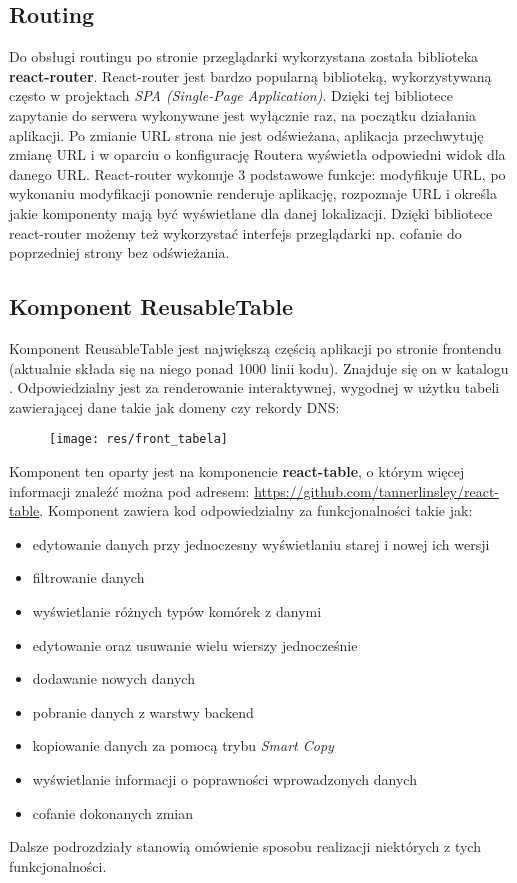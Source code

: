 \documentclass[11pt]{article}
\begin{document}
\subsection{Routing}
Do obsługi routingu po stronie przeglądarki wykorzystana została biblioteka \textbf{react-router}. React-router jest bardzo popularną biblioteką, wykorzystywaną często w projektach \emph{SPA (Single-Page Application)}. Dzięki tej bibliotece zapytanie do serwera wykonywane jest wyłącznie raz, na początku działania aplikacji. Po zmianie URL strona nie jest odświeżana, aplikacja przechwytuję zmianę URL i w oparciu o konfigurację Routera wyświetla odpowiedni widok dla danego URL. React-router wykonuje 3 podstawowe funkcje: modyfikuje URL, po wykonaniu modyfikacji ponownie renderuje aplikację, rozpoznaje URL i określa jakie komponenty mają być wyświetlane dla danej lokalizacji. Dzięki bibliotece react-router możemy też wykorzystać interfejs przeglądarki np. cofanie do poprzedniej strony bez odświeżania. 

\subsection{Komponent ReusableTable}
Komponent ReusableTable jest największą częścią aplikacji po stronie frontendu (aktualnie składa się na niego ponad 1000 linii kodu). Znajduje się on w katalogu . Odpowiedzialny jest za renderowanie interaktywnej, wygodnej w użytku tabeli zawierającej dane takie jak domeny czy rekordy DNS:
\begin{figure}[H]
\centering
\texttt{[image: res/front\_tabela]}
\end{figure}
Komponent ten oparty jest na komponencie \textbf{react-table}, o którym więcej informacji znaleźć można pod adresem: \url{https://github.com/tannerlinsley/react-table}.
Komponent zawiera kod odpowiedzialny za funkcjonalności takie jak:
\begin{itemize}
\item edytowanie danych przy jednoczesny wyświetlaniu starej i nowej ich wersji
\item filtrowanie danych
\item wyświetlanie różnych typów komórek z danymi
\item edytowanie oraz usuwanie wielu wierszy jednocześnie
\item dodawanie nowych danych
\item pobranie danych z warstwy backend
\item kopiowanie danych za pomocą trybu \emph{Smart Copy}
\item wyświetlanie informacji o poprawności wprowadzonych danych
\item cofanie dokonanych zmian
\end{itemize}
Dalsze podrozdziały stanowią omówienie sposobu realizacji niektórych z tych funkcjonalności.
\end{document}
